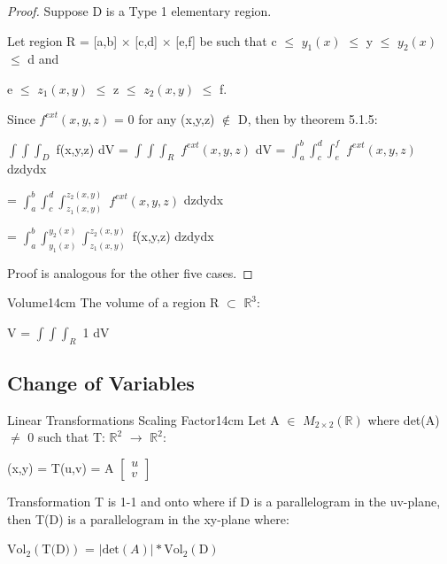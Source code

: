     \begin{proof}
        Suppose D is a Type 1 elementary region.

        Let region R = [a,b] $\times$ [c,d] $\times$ [e,f] be such that
        c $\leq$ $y_1(x)$ $\leq$ y $\leq$ $y_2(x)$ $\leq$ d and
        
        e $\leq$ $z_1(x,y)$ $\leq$ z $\leq$ $z_2(x,y)$ $\leq$ f.

        Since $f^{ext}(x,y,z)$ = 0 for any
        (x,y,z) $\not \in$ D, then by {\color{red} theorem 5.1.5}:

        \hspace{0.5cm}
        $\int \int \int_D$ f(x,y,z) dV
        = $\int \int \int_R$ $f^{ext}(x,y,z)$ dV
        = $\int_a^b \int_c^d \int_e^f$ $f^{ext}(x,y,z)$ dzdydx
        
        \hspace{3.9cm}
        = $\int_a^b \int_c^d \int_{z_1(x,y)}^{z_2(x,y)}$ $f^{ext}(x,y,z)$ dzdydx

        \hspace{3.9cm}
        = $\int_a^b \int_{y_1(x)}^{y_2(x)} \int_{z_1(x,y)}^{z_2(x,y)}$
        f(x,y,z) dzdydx

        Proof is analogous for the other five cases.
    \end{proof}

    \vspace{0.5cm}



    \begin{definition}{Volume}{14cm}
        The {\color{lblue} volume} of a region R $\subset$ $\mathbb{R}^3$:

        \hspace{0.5cm}
        V = $\int \int \int_R$ 1 dV
    \end{definition}

    \newpage





\subsection{ Change of Variables }

    \begin{wtheorem}{Linear Transformations Scaling Factor}{14cm}
        Let A $\in$ $M_{2 \times 2}(\mathbb{R})$ where det(A) $\not =$ 0
        such that T: $\mathbb{R}^2$ $\rightarrow$ $\mathbb{R}^2$:

        \hspace{0.5cm}
        (x,y) = T(u,v) = A
        $
        \begin{bmatrix}
            u \\
            v
        \end{bmatrix}
        $

        Transformation T is 1-1 and onto where if D is a parallelogram in the
        uv-plane, then T(D) is a parallelogram in the xy-plane where:

        \hspace{0.5cm}
        $\text{Vol}_2(\text{T(D)})$ = $|\text{det}(A)| * \text{Vol}_2(\text{D})$
    \end{wtheorem}

